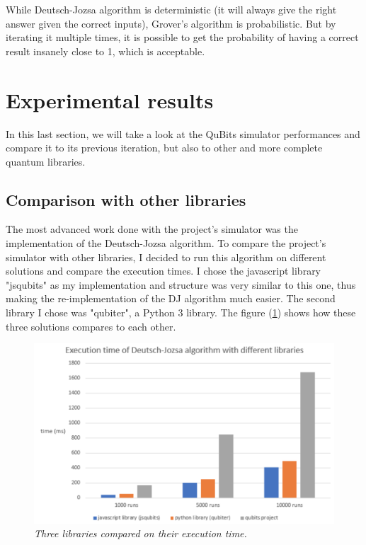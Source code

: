 \documentclass[a4paper,12pt]{report}
\newcommand{\para}[1]{\par{#1}\\}
\begin{document}
\para{
    While Deutsch-Jozsa algorithm is deterministic (it will always give the right answer given the correct inputs), Grover's algorithm is probabilistic. But by iterating it multiple times, it is possible to get the probability of having a correct result insanely close to 1, which is acceptable.
}

    \section{Experimental results}

\para{
    In this last section, we will take a look at the QuBits simulator performances and compare it to its previous iteration, but also to other and more complete quantum libraries.
}

        \subsection{Comparison with other libraries}

\para{
    The most advanced work done with the project's simulator was the implementation of the Deutsch-Jozsa algorithm. To compare the project's simulator with other libraries, I decided to run this algorithm on different solutions and compare the execution times. I chose the javascript library "jsqubits" as my implementation and structure was very similar to this one, thus making the re-implementation of the DJ algorithm much easier. The second library I chose was "qubiter", a Python 3 library. The figure (\ref{results}) shows how these three solutions compares to each other.
}

\begin{figure}
	\begin{center}
		\includegraphics[scale=0.6]{images/results}
	\end{center}
	\caption{\textit{Three libraries compared on their execution time. }}
	\label{results}
\end{figure}
\end{document}

